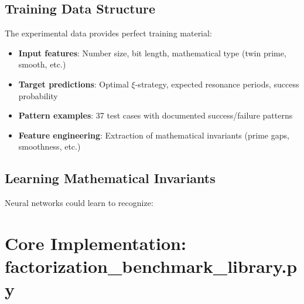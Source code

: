 	\subsection{Training Data Structure}
	
	The experimental data provides perfect training material:
	
	\begin{itemize}
		\item \textbf{Input features}: Number size, bit length, mathematical type (twin prime, smooth, etc.)
		\item \textbf{Target predictions}: Optimal $\xi$-strategy, expected resonance periods, success probability
		\item \textbf{Pattern examples}: 37 test cases with documented success/failure patterns
		\item \textbf{Feature engineering}: Extraction of mathematical invariants (prime gaps, smoothness, etc.)
	\end{itemize}
	
	\subsection{Learning Mathematical Invariants}
	
	Neural networks could learn to recognize:
	
	\begin{table}[H]
		\centering
		\caption{Learnable Mathematical Patterns}
		\label{tab:learnable_patterns}
	\end{table}
	
	\section{Core Implementation: factorization\_benchmark\_library.py}
	
